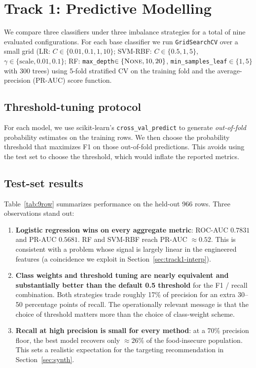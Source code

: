 \documentclass[10pt,letterpaper]{article}
\begin{document}
\section{Track 1: Predictive Modelling}
\label{sec:track1}

We compare three classifiers under three imbalance strategies for a
total of nine evaluated configurations.  For each base classifier we
run \texttt{GridSearchCV} over a small grid (LR: $C\in\{0.01,0.1,1,10\}$;
SVM-RBF: $C\in\{0.5,1,5\}$, $\gamma\in\{\text{scale},0.01,0.1\}$;
RF: \texttt{max\_depth}$\in\{\textsc{None},10,20\}$,
\texttt{min\_samples\_leaf}$\in\{1,5\}$ with $300$ trees) using 5-fold
stratified CV on the training fold and the average-precision (PR-AUC)
score function.

\subsection{Threshold-tuning protocol}
For each model, we use scikit-learn's \texttt{cross\_val\_predict} to
generate \emph{out-of-fold} probability estimates on the training rows.
We then choose the probability threshold that maximizes F1 on those
out-of-fold predictions.  This avoids using the test set to choose the
threshold, which would inflate the reported metrics.

\subsection{Test-set results}
Table~\ref{tab:9row} summarizes performance on the held-out 966 rows.
Three observations stand out:

\begin{enumerate}
\item \textbf{Logistic regression wins on every aggregate metric}:
      ROC-AUC $0.7831$ and PR-AUC $0.5681$.  RF and SVM-RBF reach
      PR-AUC $\approx 0.52$.  This is consistent with a problem whose
      signal is largely linear in the engineered features (a
      coincidence we exploit in Section~\ref{sec:track1-interp}).
\item \textbf{Class weights and threshold tuning are nearly equivalent
      and substantially better than the default 0.5 threshold} for the
      F1 / recall combination.  Both strategies trade roughly 17\% of
      precision for an extra 30--50 percentage points of recall.  The
      operationally relevant message is that the choice of threshold
      matters more than the choice of class-weight scheme.
\item \textbf{Recall at high precision is small for every method}: at
      a 70\% precision floor, the best model recovers only
      $\approx 26\%$ of the food-insecure population.  This sets a
      realistic expectation for the targeting recommendation in
      Section~\ref{sec:synth}.
\end{enumerate}
\end{document}
